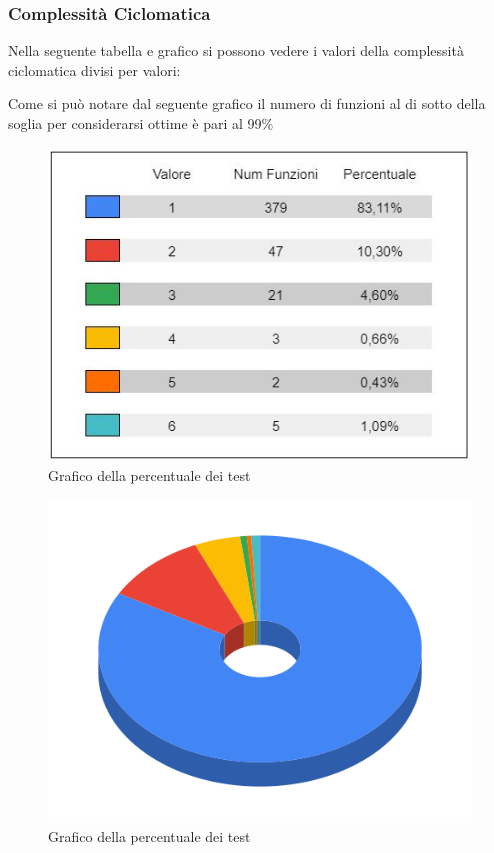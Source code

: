     \newpage
\subsubsection{Complessità Ciclomatica}
    Nella seguente tabella e grafico si possono vedere i valori della complessità ciclomatica divisi per valori:

        Come si può notare dal seguente grafico il numero di funzioni al di sotto della soglia per considerarsi ottime è pari al 99\%



    \begin{figure}[H]
        \centering
        \includegraphics[width=10 cm]{source/sections/images/tabella_CC.JPG}
        \caption{Grafico della percentuale dei test}
    \end{figure}

    \begin{figure}[H]
        \centering
        \includegraphics[width=10 cm]{source/sections/images/CC.png}
        \caption{Grafico della percentuale dei test}
    \end{figure}

